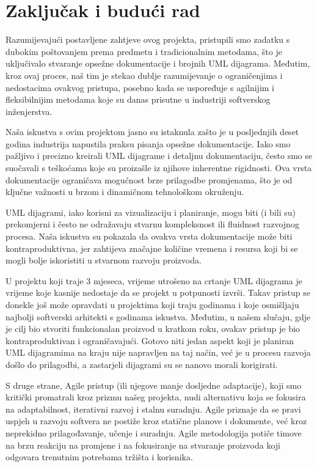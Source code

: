 \chapter{Zaključak i budući rad}
		
		Razumijevajući postavljene zahtjeve ovog projekta, 
		pristupili smo zadatku s dubokim poštovanjem prema predmetu i tradicionalnim 
		metodama, što je uključivalo stvaranje opsežne dokumentacije 
		i brojnih UML dijagrama. Međutim, kroz ovaj proces, naš tim je stekao dublje razumijevanje o ograničenjima i nedostacima ovakvog pristupa, posebno kada se uspoređuje s agilnijim i fleksibilnijim metodama koje su danas prisutne u industriji softverskog inženjerstva.
		
		Naša iskustva s ovim projektom jasno su istaknula zašto je u posljednjih deset godina industrija napustila praksu pisanja opsežne dokumentacije. Iako smo pažljivo i precizno kreirali UML dijagrame i detaljnu dokumentaciju, često smo se suočavali s teškoćama koje su proizašle iz njihove inherentne rigidnosti. Ova vrsta dokumentacije ograničava mogućnost brze prilagodbe promjenama, što je od ključne važnosti u brzom i dinamičnom tehnološkom okruženju.
		
		UML dijagrami, iako korisni za vizualizaciju i planiranje, mogu biti (i bili su) prekomjerni i često ne odražavaju stvarnu kompleksnost ili fluidnost razvojnog procesa. Naša iskustva su pokazala da ovakva vrsta dokumentacije može biti kontraproduktivna, jer zahtijeva značajne količine vremena i resursa koji bi se mogli bolje iskoristiti u stvarnom razvoju proizvoda.
		
		U projektu koji traje 3 mjeseca, vrijeme utrošeno na crtanje UML dijagrama je vrijeme koje kasnije nedostaje da se projekt u potpunosti izvrši. Takav pristup se donekle još može opravdati u projektima koji traju godinama i koje osmišljaju najbolji softverski arhitekti s godinama iskustva. Međutim, u našem slučaju, gdje je cilj bio stvoriti funkcionalan proizvod u kratkom roku, ovakav pristup je bio kontraproduktivan i ograničavajući. Gotovo niti jedan aspekt koji je planiran UML dijagramima na kraju nije napravljen na taj način, već je u procesu razvoja došlo do prilagodbi, a zastarjeli dijagrami su se nanovo morali korigirati.

		S druge strane, Agile pristup (ili njegove manje dosljedne adaptacije), koji smo kritički promatrali kroz prizmu našeg projekta, nudi alternativu koja se fokusira na adaptabilnost, iterativni razvoj i stalnu suradnju. Agile priznaje da se pravi uspjeh u razvoju softvera ne postiže kroz statične planove i dokumente, već kroz neprekidno prilagođavanje, učenje i suradnju. Agile metodologija potiče timove na brzu reakciju na promjene i na fokusiranje na stvaranje proizvoda koji odgovara trenutnim potrebama tržišta i korisnika.
		
